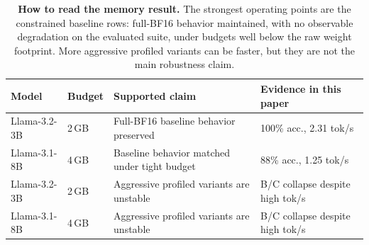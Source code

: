 \documentclass{article}
\begin{document}
\begin{table}[H]
\centering
\caption{\textbf{How to read the memory result.} The strongest operating points are the
constrained baseline rows: full-BF16 behavior maintained, with no observable
degradation on the evaluated suite, under budgets well below the raw
weight footprint. More aggressive profiled variants can be faster, but they are not the
main robustness claim.}
\label{tab:memory_takeaway}
\footnotesize
\begin{tabular}{llll}
\toprule
Model & Budget & Supported claim & Evidence in this paper \\
\midrule
Llama-3.2-3B & 2\,GB & Full-BF16 baseline behavior preserved & 100\% acc., 2.31 tok/s \\
Llama-3.1-8B & 4\,GB & Baseline behavior matched under tight budget & 88\% acc., 1.25 tok/s \\
Llama-3.2-3B & 2\,GB & Aggressive profiled variants are unstable & B/C collapse despite high tok/s \\
Llama-3.1-8B & 4\,GB & Aggressive profiled variants are unstable & B/C collapse despite high tok/s \\
\bottomrule
\end{tabular}
\end{table}
\end{document}
